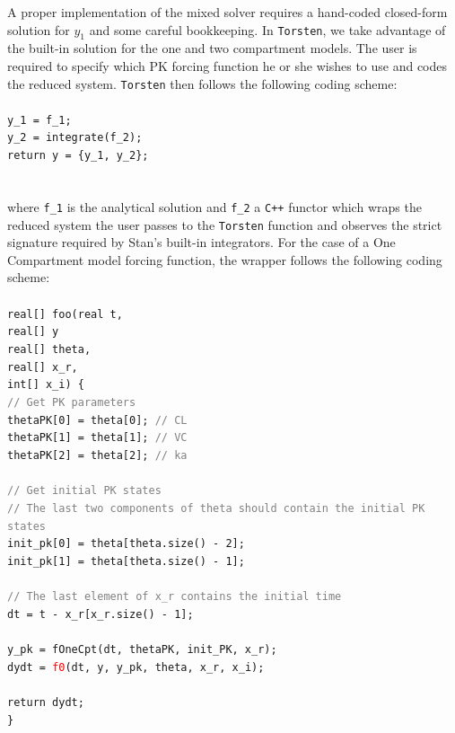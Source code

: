 \documentclass[11pt]{article}
\begin{document}
A proper implementation of the mixed solver requires a hand-coded closed-form solution for $y_1$ 
and some careful bookkeeping. In \texttt{Torsten}, we take advantage of the built-in solution for the one and 
two compartment models. The user is required
to specify which PK forcing function he or she wishes to use and codes the reduced system. 
\texttt{Torsten} then follows the following coding scheme: \\ \\
%
\texttt{y\_1 = f\_1; \\
y\_2 = integrate(f\_2); \\
return y = \{y\_1, y\_2\}; \\
  } \\ \\
%
where \texttt{f\_1} is the analytical solution and \texttt{f\_2} a \texttt{C++} functor which wraps the reduced
system the user passes to the \texttt{Torsten} function and observes the strict signature required by Stan's
built-in integrators. For the case of a One Compartment model forcing function, the wrapper follows 
the following coding scheme: \\ \\
%
\texttt{real[] foo(real t, \\
\phantom{real[] foo(}real[] y \\
\phantom{real[] foo(}real[] theta,  \\
\phantom{real[] foo(}real[] x\_r, \\
\phantom{real[] foo(}int[] x\_i) \{ \\
%
 \phantom{  } \textcolor{gray}{// Get PK parameters} \\
 \phantom{  } thetaPK[0] = theta[0];  \textcolor{gray}{// CL} \\
 \phantom{  } thetaPK[1] = theta[1];  \textcolor{gray}{// VC} \\
 \phantom{  } thetaPK[2] = theta[2];  \textcolor{gray}{// ka} \\ \ \\
% 
 \phantom{  } \textcolor{gray}{// Get initial PK states} \\
 \phantom{  } \textcolor{gray}{// The last two components of theta should contain the initial PK states} \\
 \phantom{  }  init\_pk[0] = theta[theta.size() - 2]; \\
 \phantom{  }  init\_pk[1] = theta[theta.size() - 1]; \\ \ \\
%  
 \phantom{  }  \textcolor{gray}{// The last element of x\_r contains the initial time} \\
 \phantom{  }  dt = t - x\_r[x\_r.size() - 1]; \\ \ \\
% 
 \phantom{  }  y\_pk = fOneCpt(dt, thetaPK, init\_PK, x\_r); \\
 \phantom{  }  dydt = \textcolor{red}{f0}(dt, y, y\_pk, theta, x\_r, x\_i); \\ \ \\
%  
 \phantom{  }  return dydt; \\
\}
} \\ \\
\end{document}
